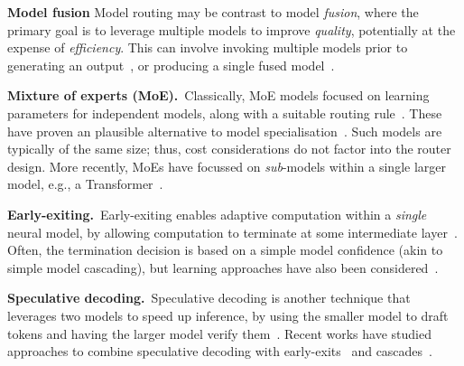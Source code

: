 \textbf{Model fusion}
Model routing may be contrast to model \emph{fusion}, 
where the primary goal is to leverage multiple models to improve \emph{quality}, 
potentially at the expense of \emph{efficiency}.
This can involve
invoking multiple models prior to generating an output~\citep{Ravaut:2022,Jiang:2023,Guha:2024,Wang:2024,Hu:2024b},
or producing a single fused model~\citep{Singh:2020}.


\textbf{Mixture of experts (MoE).}\
Classically, MoE models focused on learning parameters for independent models, along with a suitable routing rule~\citep{Jacobs:1991,Jordan:1993}.
These have proven an plausible alternative to model specialisation~\citep{Jang:2023,Douillard:2024}.
Such models are typically of the same size; thus, cost considerations do not factor into the router design.
More recently, MoEs have focussed on \emph{sub}-models within a single larger model, e.g., a Transformer~\citep{Fedus:2022,Zhou:2022}.


\textbf{Early-exiting.}\
Early-exiting enables adaptive computation within a \emph{single} neural model,
by allowing computation to terminate at some intermediate layer~\citep{TeeMcDKun2016,ScaScaBac2020,Zhou:2020}. 
Often, the termination decision is based on a simple model confidence (akin to simple model cascading),
but learning approaches have also been considered~\citep{XinNogYu2020,SchFisGup2022}.


\textbf{Speculative decoding.}\
Speculative decoding is another technique that leverages two models to speed up inference, by using the smaller model to draft tokens and having the larger model verify them~\citep{Stern:2018,chen2023accelerating,leviathan2023fast,Tran-Thien_2023,Sun:2023,Zhou:2024,Cai:2024b,Li:2024,Li:2024b}.
Recent
works have studied approaches to combine
speculative decoding
with
early-exits~\citep{Elhoushi_2024} 
and
cascades~\citep{Narasimhan:2024}.

\setlength{\tabcolsep}{0.2em} %
\renewcommand{\arraystretch}{1.2}  %


